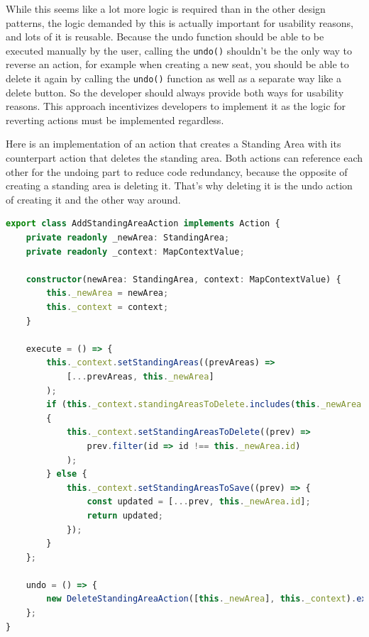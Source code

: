 \newpage

While this seems like a lot more logic is required than in the other design patterns, the logic demanded by this is actually important for usability reasons, and lots of it is reusable. Because the undo function should be able to be executed manually by the user, calling the \texttt{undo()} shouldn't be the only way to reverse an action, for example when creating a new seat, you should be able to delete it again by calling the \texttt{undo()} function as well as a separate way like a delete button. So the developer should always provide both ways for usability reasons. This approach incentivizes developers to implement it as the logic for reverting actions must be implemented regardless.

Here is an implementation of an action that creates a Standing Area with its counterpart action that deletes the standing area. Both actions can reference each other for the undoing part to reduce code redundancy, because the opposite of creating a standing area is deleting it. That's why deleting it is the undo action of creating it and the other way around.

\begin{lstlisting}[language=TypeScript,caption={Add Standing Area Action Implementation},label={lst:add-standing-area-action-implementation}]
export class AddStandingAreaAction implements Action {
    private readonly _newArea: StandingArea;
    private readonly _context: MapContextValue;

    constructor(newArea: StandingArea, context: MapContextValue) {
        this._newArea = newArea;
        this._context = context;
    }

    execute = () => {
        this._context.setStandingAreas((prevAreas) => 
            [...prevAreas, this._newArea]
        );
        if (this._context.standingAreasToDelete.includes(this._newArea.id))
        {
            this._context.setStandingAreasToDelete((prev) =>
                prev.filter(id => id !== this._newArea.id)
            );
        } else {
            this._context.setStandingAreasToSave((prev) => {
                const updated = [...prev, this._newArea.id];
                return updated;
            });
        }
    };

    undo = () => {
        new DeleteStandingAreaAction([this._newArea], this._context).execute()
    };
}
\end{lstlisting}

\newpage

